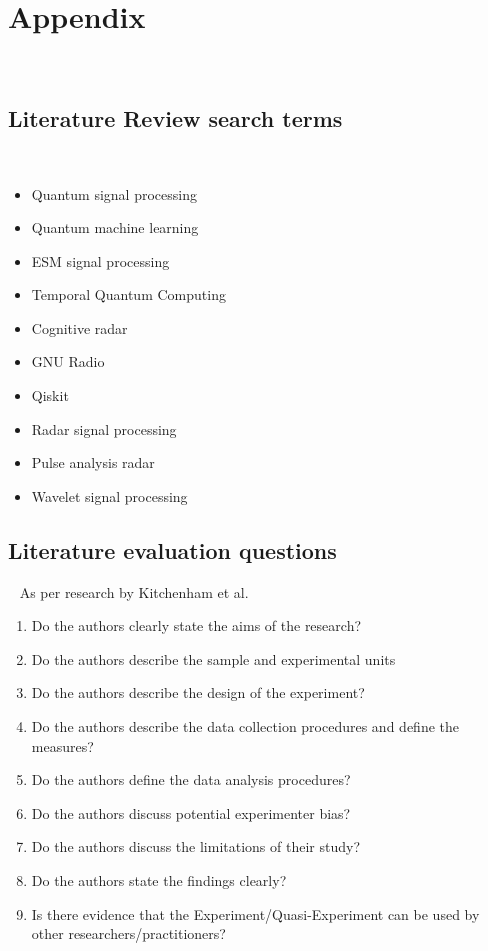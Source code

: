 \section{Appendix}~\label{sec:appendix}
\subsection{Literature Review search terms}~\label{sec:appendix1}
\begin{itemize}
    \item Quantum signal processing
    \item Quantum machine learning
    \item \ac{ESM} signal processing
    \item Temporal Quantum Computing
    \item Cognitive radar
    \item GNU Radio
    \item Qiskit
    \item Radar signal processing
    \item Pulse analysis radar
    \item Wavelet signal processing
\end{itemize}

\subsection{Literature evaluation questions}~\label{sec:appendix2}
As per research by Kitchenham et al. \cite{kitchenham_can_2010}
\begin{enumerate}[label=Q\arabic*]
    \item Do the authors clearly state the aims of the research?
    \item Do the authors describe the sample and experimental units
    \item Do the authors describe the design of the experiment?
    \item Do the authors describe the data collection procedures and define the measures?
    \item Do the authors define the data analysis procedures?
    \item Do the authors discuss potential experimenter bias?
    \item Do the authors discuss the limitations of their study?
    \item Do the authors state the findings clearly?
    \item Is there evidence that the Experiment/Quasi-Experiment can be used by other researchers/practitioners?
\end{enumerate}



